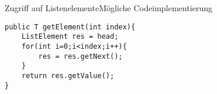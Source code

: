 \begin{frame}[fragile]{Zugriff auf Listenelemente}{Mögliche Codeimplementierung}
\lstset{style=java}
\begin{lstlisting}
public T getElement(int index){
	ListElement res = head;
	for(int i=0;i<index;i++){
		res = res.getNext();
	}
	return res.getValue();
}
\end{lstlisting}
\end{frame}